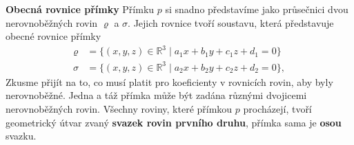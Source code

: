 \begin{mdframed}[style=mdexam]
  \begin{example}\label{mai:exam041}
    \textbf{Obecná rovnice přímky}\newline
    Přímku \(p\) si snadno představíme jako průsečnici dvou nerovnoběžných rovin \(\varrho\) a 
    \(\sigma\). Jejich rovnice tvoří soustavu, která představuje obecné rovnice přímky
      \begin{align*}
        \varrho &= \{(x, y, z)\in\mathbb{R}^3\mid a_1x+ b_1y+ c_1z+ d_1 = 0 \}  \\ 
        \sigma  &= \{(x, y, z)\in\mathbb{R}^3\mid a_2x+ b_2y+ c_2z+ d_2 = 0 \}, 
      \end{align*}
    Zkusme přijít na to, co musí platit pro koeficienty v rovnicích rovin, aby byly nerovnoběžné. 
    Jedna a táž přímka může být zadána různými dvojicemi nerovnoběžných rovin. Všechny roviny, které 
    přímkou \(p\) procházejí, tvoří geometrický útvar zvaný \textbf{svazek rovin prvního druhu}, 
    přímka sama je \textbf{osou} svazku. 
  \end{example}
\end{mdframed}